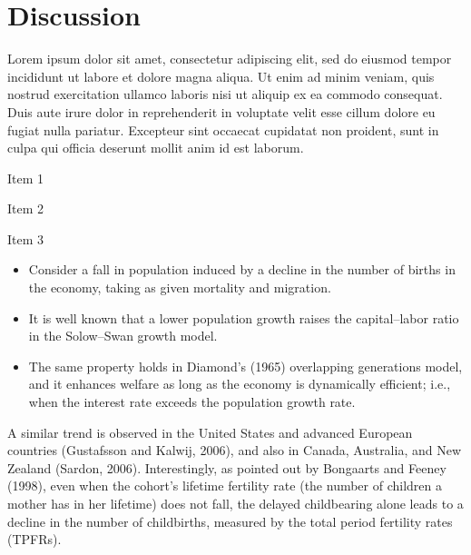 \documentclass[nogrid]{MBE}%
\begin{document}
\section{{Discussion}\label{sec:Discussion}}

Lorem ipsum dolor sit amet, consectetur adipiscing elit, sed do eiusmod tempor incididunt ut labore et dolore magna aliqua. Ut enim ad minim veniam, quis nostrud exercitation ullamco laboris nisi ut aliquip ex ea commodo consequat. Duis aute irure dolor in reprehenderit in voluptate velit esse cillum dolore eu fugiat nulla pariatur. Excepteur sint occaecat cupidatat non proident, sunt in culpa qui officia deserunt mollit anim id est laborum.

\begin{arabiclist}
\item Item 1

\item Item 2

\item Item 3
\end{arabiclist}

\begin{itemize}
\item Consider a fall in population induced by a decline in the number of births in the economy,
taking as given mortality and migration.

\item It is well known that a lower population growth raises the capital--labor ratio in the Solow--Swan
growth model.

\item The same property holds in Diamond's (1965) overlapping generations model, and it enhances welfare
as long as the economy is dynamically efficient; i.e., when the interest rate exceeds the
population growth rate.
\end{itemize}
 A similar trend is observed in the United
States and advanced European countries (Gustafsson and Kalwij, 2006), and also in Canada,
Australia, and New Zealand (Sardon, 2006). Interestingly, as pointed out by Bongaarts and Feeney
(1998), even when the cohort's lifetime fertility rate (the number of children a mother has in her
lifetime) does not fall, the delayed childbearing alone leads to a decline in the number of
childbirths, measured by the total period fertility rates (TPFRs). %
\end{document}
